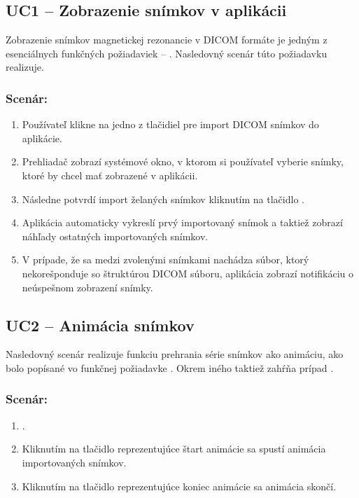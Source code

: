 \subsection {UC1 -- Zobrazenie snímkov v aplikácii}\label{uc1}
Zobrazenie snímkov magnetickej rezonancie v DICOM formáte je jedným z esenciálnych funkčných požiadaviek -- . Nasledovný scenár túto požiadavku realizuje.

\subsubsection*{Scenár:}
\begin {enumerate}
\item {Používateľ klikne na jedno z tlačidiel pre import DICOM snímkov do aplikácie.}
\item {Prehliadač zobrazí systémové okno, v ktorom si používateľ vyberie snímky, ktoré by chcel mať zobrazené v aplikácii.}
\item {Následne potvrdí import želaných snímkov kliknutím na tlačidlo .}
\item {Aplikácia automaticky vykreslí prvý importovaný snímok a taktiež zobrazí náhľady ostatných importovaných snímkov.}
\item {V prípade, že sa medzi zvolenými snímkami nachádza súbor, ktorý nekorešponduje so štruktúrou DICOM súboru, aplikácia zobrazí notifikáciu o neúspešnom zobrazení snímky.}
\end {enumerate}
	
\subsection {UC2 -- Animácia snímkov}
Nasledovný scenár realizuje funkciu prehrania série snímkov ako animáciu, ako bolo popísané vo funkčnej požiadavke .
Okrem iného taktiež zahŕňa prípad . 

\subsubsection*{Scenár:}
\begin {enumerate}
\item {.}
\item {Kliknutím na tlačidlo reprezentujúce štart animácie sa spustí animácia importovaných snímkov.}
\item {Kliknutím na tlačidlo reprezentujúce koniec animácie sa animácia skončí.}
\end {enumerate}

